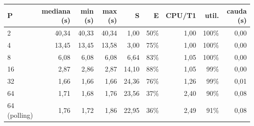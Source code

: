 \begin{tabular}{lrrrrrrrr}
\toprule
P & mediana (s) & min (s) & max (s) & S & E & CPU/T1 & util. & cauda (s) \\
\midrule
2 & 40,34 & 40,33 & 40,34 & 1,00 & 50\% & 1,00 & 100\% & 0,00 \\
4 & 13,45 & 13,45 & 13,58 & 3,00 & 75\% & 1,00 & 100\% & 0,00 \\
8 & 6,08 & 6,08 & 6,08 & 6,64 & 83\% & 1,05 & 100\% & 0,00 \\
16 & 2,87 & 2,86 & 2,87 & 14,10 & 88\% & 1,05 & 99\% & 0,00 \\
32 & 1,66 & 1,66 & 1,66 & 24,36 & 76\% & 1,26 & 99\% & 0,01 \\
64 & 1,71 & 1,68 & 1,76 & 23,56 & 37\% & 2,40 & 90\% & 0,08 \\
64 (polling) & 1,76 & 1,72 & 1,86 & 22,95 & 36\% & 2,49 & 91\% & 0,08 \\
\bottomrule
\end{tabular}
